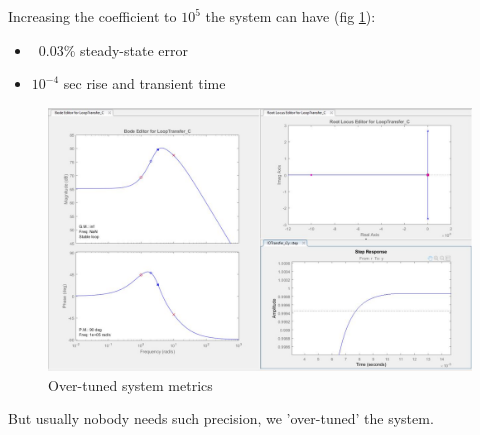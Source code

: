 \documentclass[12pt,letterpaper]{article}
\begin{document}
    Increasing the coefficient to $10^5$ the system can have (fig \ref{fig:overtuned_metrics}):
        \begin{itemize}
        \item ~0.03\% steady-state error
        \item $10 ^ {-4}$ sec rise and transient time
    \end{itemize}
    \begin{figure}[H]
        \centering
        \includegraphics[width=16cm]{images/output/sys_overtuned.jpg}
        \caption{Over-tuned system metrics}
        \label{fig:overtuned_metrics}
    \end{figure}
    But usually nobody needs such precision, we 'over-tuned' the system.
\end{document}
